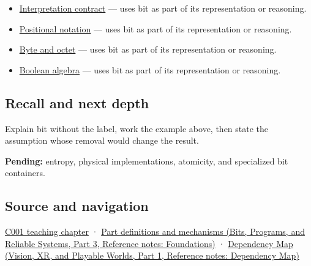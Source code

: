 \begin{itemize}
\tightlist
\item
  \hyperref[appendix-f414bd4ed05c]{Interpretation contract} --- uses bit as part of its representation or reasoning.
\item
  \hyperref[appendix-83c3f28f7bda]{Positional notation} --- uses bit as part of its representation or reasoning.
\item
  \hyperref[appendix-5bee2df85484]{Byte and octet} --- uses bit as part of its representation or reasoning.
\item
  \hyperref[appendix-24475e1596a8]{Boolean algebra} --- uses bit as part of its representation or reasoning.
\end{itemize}

\subsection{Recall and next depth}\label{appendix-ddbb69998a2e-recall-and-next-depth}

\hypertarget{appendix-ddbb69998a2e-recall-and-next-depth}{}

Explain bit without the label, work the example above, then state the assumption whose removal would change the result.

\textbf{Pending:} entropy, physical implementations, atomicity, and specialized bit containers.

\subsection{Source and navigation}\label{appendix-ddbb69998a2e-source-and-navigation}

\hypertarget{appendix-ddbb69998a2e-source-and-navigation}{}

\hyperref[01-foundations-i-ch001-from-a-signal-to-an-interpretation]{C001 teaching chapter} · \href{../01-Bits-Programs-and-Reliable-Systems-P03/main.pdf\#appendix-fd090d982a15}{Part definitions and mechanisms (Bits, Programs, and Reliable Systems, Part 3, Reference notes: Foundations)} · \href{../07-Vision-XR-and-Playable-Worlds-P01/main.pdf\#appendix-4ad47bdd269a}{Dependency Map (Vision, XR, and Playable Worlds, Part 1, Reference notes: Dependency Map)}

